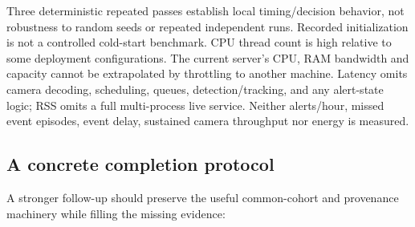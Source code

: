 \documentclass[11pt,a4paper]{article}
\begin{document}
Three deterministic repeated passes establish local timing/decision behavior, not robustness to random seeds or repeated independent runs. Recorded initialization is not a controlled cold-start benchmark. CPU thread count is high relative to some deployment configurations. The current server's CPU, RAM bandwidth and capacity cannot be extrapolated by throttling to another machine. Latency omits camera decoding, scheduling, queues, detection/tracking, and any alert-state logic; RSS omits a full multi-process live service. Neither alerts/hour, missed event episodes, event delay, sustained camera throughput nor energy is measured.

\subsection{A concrete completion protocol}
A stronger follow-up should preserve the useful common-cohort and provenance machinery while filling the missing evidence:
\end{document}
